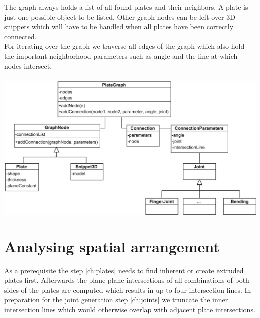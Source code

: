 \documentclass[../ClassicThesis.tex]{subfiles}
\begin{document}
The graph always holds a list of all found plates and their neighbors. A plate is just one possible object to be listed. Other graph nodes can be left over 3D snippets which will have to be handled when all plates have been correctly connected.\\
For iterating over the graph we traverse all edges of the graph which also hold the important neighborhood parameters such as angle and the line at which nodes intersect.\\\* \\
\hspace*{-1.8cm}
\includegraphics[width=1.3\columnwidth]{Images/GraphStructure.png}


\section{Analysing spatial arrangement}
As a prerequisite the step \ref{ch:plates} needs to find inherent or create extruded plates first. Afterwards the plane-plane intersections of all combinations of both sides of the plates are computed which results in up to four intersection lines. In preparation for the joint generation step \ref{ch:joints} we truncate the inner intersection lines which would otherwise overlap with adjacent plate intersections.
\end{document}
